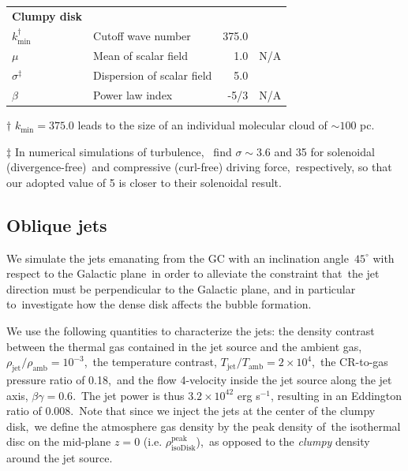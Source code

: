 \documentclass[fleqn,usenatbib,useAMS]{mnras}
\begin{document}
\begin{table}
\begin{tabular}{@{}llrc@{}}
{\bf Clumpy disk }                    &                                &                                      &                                \\
$k_{\text{min}}^\dagger$            & Cutoff wave number             & 375.0                                & \citep{peak-ism-density}       \\
$\mu$                                 & Mean of scalar field           & 1.0                                  &   N/A                          \\
$\sigma^\ddag$                 & Dispersion of scalar field     & 5.0                                  & \citep{Federrath2010}          \\
$\beta$                               & Power law index                & -5/3                                 &   N/A                          \\ \midrule
\end{tabular}
\begin{tablenotes}
      \raggedright
      \item  $\dagger$  $k_{\text{min}}=375.0$ leads to the size of an individual molecular cloud of $\sim 100$ pc.
      \item  $\ddag$ In numerical simulations of turbulence,\
             \citet{Federrath2010} find $\sigma\sim 3.6$ and 35 for solenoidal (divergence-free)\
             and compressive (curl-free) driving force,\
             respectively, so that our adopted value of 5 is closer to their solenoidal result.
    \end{tablenotes}
\end{table}

%

\subsection{Oblique jets}

  We simulate the jets emanating from the GC with an inclination angle\
  $45^{\circ}$ with respect to the Galactic plane\
  in order to alleviate the constraint that\
  the jet direction must be perpendicular to the Galactic plane, and in particular to\
  investigate how the dense disk affects the bubble formation.


  We use the following quantities to characterize the jets:
  the density contrast between the thermal gas contained in the jet source and the ambient gas,\
  $\rho_{\text{jet}}/\rho_{\text{amb}}=10^{-3}$,\
  the temperature contrast, $T_{\text{jet}}/T_{\text{amb}}=2\times10^{4}$,\
  the CR-to-gas pressure ratio of 0.18,\
  and the flow 4-velocity inside the jet source along the jet axis, $\beta\gamma = 0.6$.\
  The jet power is thus $3.2\times 10^{42}$ erg s$^{-1}$, resulting in an Eddington ratio of 0.008.\
  Note that since we inject the jets at the center of the clumpy disk,\
  we define the atmosphere gas density by the peak density of\
  the isothermal disc on the mid-plane $z=0$ (i.e. $\rho^{\text{peak}}_{\text{isoDisk}}$),\
  as opposed to the \textit{clumpy} density around the jet source.
\end{document}

